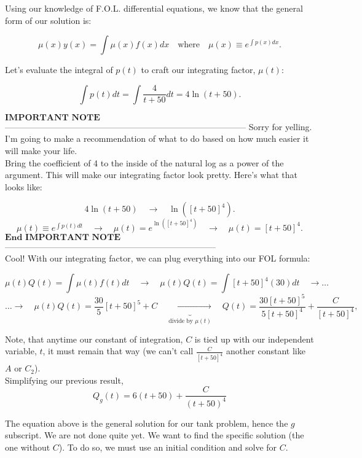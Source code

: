 \documentclass[a4paper,12pt]{article}
\begin{document}
Using our knowledge of F.O.L. differential equations, we know that the general form of our solution is:

$$ \mu(x)y(x) = \int \mu(x)f(x)dx \quad \text{where} \quad \mu(x) \equiv e^{\int p(x)dx}.
$$

Let's evaluate the integral of $p(t)$ to craft our integrating factor, $\mu(t)$:

$$ \int p(t)dt = \int \frac{4}{t + 50}dt = 4\ln{(t + 50)}. $$

$\boxed{\textbf{IMPORTANT NOTE}}$------------------------------------------------------------------------------------
Sorry for yelling. I'm going to make a recommendation of what to do based on how much easier it will make your life.\\

Bring the coefficient of 4 to the inside of the natural log as a power of the argument. This will make our integrating factor look pretty. Here's what that looks like:

$$  4\ln{(t + 50)} \quad\rightarrow\quad \ln{([t + 50]^4)}. $$
$$\mu(t) \equiv e^{\int p(t)dt}\quad\rightarrow\quad \mu(t) = e^{\ln{([t + 50]^4)}} \quad\rightarrow\quad \mu(t) = [t+50]^4.
 $$
$\boxed{\textbf{End IMPORTANT NOTE}}$--------------------------------------------------------------------------\\

Cool! With our integrating factor, we can plug everything into our FOL formula:

$$ \mu(t) Q(t)=\int \mu(t) f(t) d t \quad\rightarrow\quad \mu(t) Q(t)=\int[t+50]^4(30) d t \quad\rightarrow\ldots
 $$
 $$ \ldots\rightarrow\quad \mu(t) Q(t)=\frac{30}{5}[t+50]^5+C \quad \underbrace{\rightarrow}_{\text{divide by $\mu(t)$}} \quad Q(t)=\frac{30[t+50]^5}{5[t+50]^4}+\frac{C}{[t+50]^4},
 $$
 
 Note, that anytime our constant of integration, $C$ is tied up with our independent variable, $t$, it must remain that way (we can't call $\frac{C}{[t+50]^4}$ another constant like $A$ or $C_2$).\\

Simplifying our previous result,
$$
\boxed{Q_g(t)=6(t+50)+\frac{C}{(t+50)^4}}
$$

The equation above is the general solution for our tank problem, hence the $g$ subscript. We are not done quite yet. We want to find the specific solution (the one without $C$). To do so, we must use an initial condition and solve for $C$.\\
\end{document}
